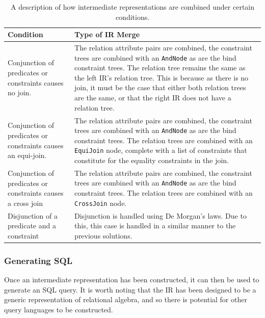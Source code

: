 \documentclass[a4paper, 11pt]{article}
\begin{document}
      \begin{table}
        \begin{tabular}{ | 
          p{} |
          p{} |
        }

        \hline
        Condition & Type of IR Merge \\
        \hline

        Conjunction of predicates or constraints causes no join.
        & 
        The relation attribute pairs are combined, the constraint trees are
        combined with an \texttt{AndNode} as are the bind constraint trees. The relation
        tree remains the same as the left IR's relation tree. This is because
        as there is no join, it must be the case that either both
        relation trees are the same, or that the right IR does not have a
        relation tree.
        \\\hline
        Conjunction of predicates or constraints causes an equi-join.
        & 
        The relation attribute pairs are combined, the constraint trees are
        combined with an \texttt{AndNode} as are the bind constraint trees. The relation
        trees are combined with an \texttt{EquiJoin} node, complete with a list of
        constraints that constitute for the equality constraints in the join.
        \\\hline
        Conjunction of predicates or constraints causes a cross join
        & 
        The relation attribute pairs are combined, the constraint trees are
        combined with an \texttt{AndNode} as are the bind constraint trees. The relation
        trees are combined with an \texttt{CrossJoin} node.
        \\\hline
        Disjunction of a predicate and a constraint
        & 
        Disjunction is handled using De Morgan's laws. Due to this, this case
        is handled in a similar manner to the previous solutions.
        \\\hline
      \end{tabular}
        \caption{A description of how intermediate representations are combined
          under certain conditions.}
        \label{ircomb}
    \end{table}

      \subsubsection{Generating SQL}
        Once an intermediate representation has been constructed, it can then
        be used to generate an SQL query. It is worth noting that the IR has
        been designed to be a generic representation of relational algebra, and
        so there is potential for other query languages to be constructed.
\end{document}
